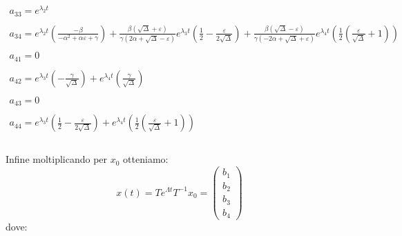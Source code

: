 \begin{tiny}
\begin{displaymath}
\begin{array}{c}
a_{33}=e^{\lambda_{2}t} \\ \\
a_{34}=e^{\lambda_{2}t}(\frac{-\beta}{-\alpha^{2}+\alpha\varepsilon+\gamma})+\frac{\beta(\sqrt{\Delta}+\varepsilon)}{\gamma(2\alpha+\sqrt{\Delta}-\varepsilon)}e^{\lambda_{3}t}(\frac{1}{2}-\frac{\varepsilon}{2\sqrt{\Delta}})+\frac{\beta(\sqrt{\Delta}-\varepsilon)}{\gamma(-2\alpha+\sqrt{\Delta}+\varepsilon)}e^{\lambda_{4}t}(\frac{1}{2}(\frac{\varepsilon}{\sqrt{\Delta}}+1)) \\ \\
a_{41}=0 \\ \\
a_{42}=e^{\lambda_{3}t}(-\frac{\gamma}{\sqrt{\Delta}})+e^{\lambda_{4}t}(\frac{\gamma}{\sqrt{\Delta}}) \\ \\
a_{43}=0 \\ \\
a_{44}=e^{\lambda_{3}t}(\frac{1}{2}-\frac{\varepsilon}{2\sqrt{\Delta}})+e^{\lambda_{4}t}(\frac{1}{2}(\frac{\varepsilon}{\sqrt{\Delta}}+1)) \\ \\
\end{array}
\end{displaymath}
\end{tiny}
Infine moltiplicando per $x_{0}$ otteniamo:
\begin{displaymath}
x(t)=Te^{\Lambda t}T^{-1}x_{0}=\left(\begin{array}{c}
b_{1}\\
b_{2}\\
b_{3}\\
b_{4}
\end{array}\right)
\end{displaymath}
dove:
